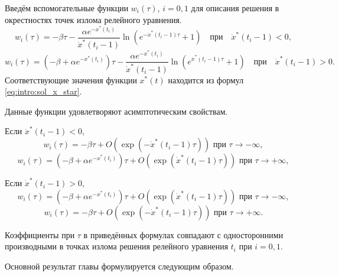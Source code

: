 \medskip

Введём вспомогательные функции $w_i(\tau)$, $i = 0, 1$ для описания решения в окрестностях точек излома релейного уравнения.
\[
w_i(\tau) = -\beta \tau - \dfrac{\alpha e^{-x^*(t_i)}}{\dot{x}^*(t_i - 1)} \ln\left(e^{-\dot{x}^*(t_i - 1)\tau} + 1\right) \quad \text{при} \quad \dot{x}^*(t_i - 1) < 0,
\]
\[
w_i(\tau) = (-\beta + \alpha e^{-x^*(t_i)})\tau - \dfrac{\alpha e^{-x^*(t_i)}}{\dot{x}^*(t_i - 1)} \ln\left(e^{\dot{x}^*(t_i - 1)\tau} + 1\right) \quad \text{при} \quad \dot{x}^*(t_i - 1) > 0.
\]
Соответствующие значения функции $x^*(t)$ находится из формул \eqref{eq:intro:sol_x_star}.

Данные функции удовлетворяют асимптотическим свойствам.

Если $\dot{x}^*(t_i - 1) < 0$,
\begin{equation*}
	w_i(\tau) = -\beta \tau + O(\exp(-\dot{x}^*(t_i - 1) \tau)) \text{ при } \tau \to -\infty,
\end{equation*}
\begin{equation*}
	w_i(\tau) = (-\beta + \alpha e^{-x^*(t_i)})\tau + O(\exp(\dot{x}^*(t_i - 1) \tau)) \text{ при } \tau \to +\infty,
\end{equation*}

Если $\dot{x}^*(t_i - 1) > 0$,
\begin{equation*}
	w_i(\tau) = (-\beta + \alpha e^{-x^*(t_i)})\tau + O(\exp(\dot{x}^*(t_i - 1) \tau)) \text{ при } \tau \to -\infty,
\end{equation*}
\begin{equation*}
	w_i(\tau) = -\beta \tau + O(\exp(-\dot{x}^*(t_i - 1) \tau)) \text{ при } \tau \to +\infty.
\end{equation*}

Коэффициенты при $\tau$ в приведённых формулах совпадают с односторонними производными в точках излома решения релейного уравнения $t_i$ при $i = 0, 1$.

Основной результат главы формулируется следующим образом.

\bigskip

